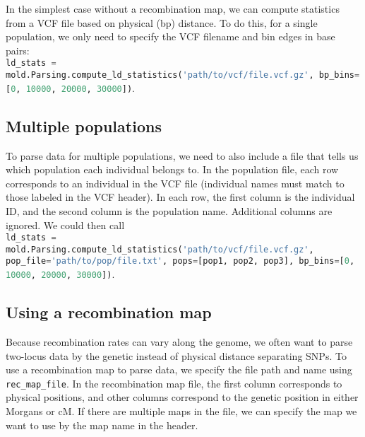 \documentclass[10pt]{article}
\makeatletter
\newcommand{\py}[1]{\lstinline[breaklines=true,language=Python, showstringspaces=False]@#1@}
\makeatother
\begin{document}
In the simplest case without a recombination map, we can compute statistics from a VCF file based on physical (bp) distance.
To do this, for a single population, we only need to specify the VCF filename and bin edges in base pairs:\\
\py{ld_stats = mold.Parsing.compute_ld_statistics('path/to/vcf/file.vcf.gz', bp_bins=[0, 10000, 20000, 30000])}.

\subsection{Multiple populations}

To parse data for multiple populations, we need to also include a file that tells us which population each individual belongs to.
In the population file, each row corresponds to an individual in the VCF file (individual names must match to those labeled in the VCF header).
In each row, the first column is the individual ID, and the second column is the population name.
Additional columns are ignored.
We could then call \\
\py{ld_stats = mold.Parsing.compute_ld_statistics('path/to/vcf/file.vcf.gz', pop_file='path/to/pop/file.txt', pops=[pop1, pop2, pop3], bp_bins=[0, 10000, 20000, 30000])}.

\subsection{Using a recombination map}

Because recombination rates can vary along the genome, we often want to parse two-locus data by the genetic instead of physical distance separating SNPs.
To use a recombination map to parse data, we specify the file path and name using \py{rec_map_file}.
In the recombination map file, the first column corresponds to physical positions, and other columns correspond to the genetic position in either Morgans or cM.
If there are multiple maps in the file, we can specify the map we want to use by the map name in the header.
\end{document}

